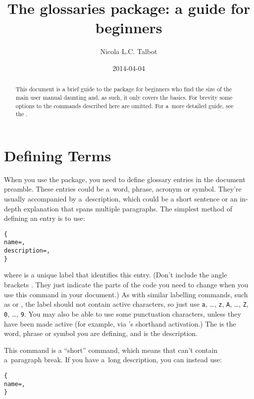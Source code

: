 \documentclass{nlctdoc}
\title{The glossaries package: a guide for beginners}
\author{Nicola L.C. Talbot}
\date{2014-04-04}
\begin{document}
\maketitle

\begin{abstract}
This document is a brief guide to the  package
for beginners who find the size of the main user manual daunting
and, as such, it only covers the basics. For brevity some options to
the commands described here are omitted. For a~more detailed guide,
see the .
\end{abstract}

\tableofcontents

\section{Defining Terms}
\label{sec:defterm}

When you use the  package, you need to define
glossary entries in the document preamble. These entries could be
a~word, phrase, acronym or symbol. They're usually accompanied by
a~description, which could be a short sentence or an in-depth
explanation that spans multiple paragraphs. The simplest method of
defining an entry is to use:
\begin{definition}
\begin{alltt}
\verb|{|
  name=,
  description=,
\verb|}|
\end{alltt}
\end{definition}
where  is a unique label that identifies this entry.
(Don't include the angle brackets \meta{ }. They just indicate the parts of
the code you need to change when you use this command in your document.) As
with similar labelling commands, such as  or ,
the label should not contain active characters, so just use
\texttt{a}, \ldots, \texttt{z}, \texttt{A}, \ldots, \texttt{Z},
\texttt{0}, \ldots, \texttt{9}. You may also be able to use some
punctuation characters, unless they have been made active (for
example, via 's shorthand activation.)
The  is the word, phrase or symbol you are defining,
and  is the description.

This command is a ``short'' command, which means that
 can't contain a~paragraph break. If you have
a~long description, you can instead use:
\begin{definition}
\begin{alltt}
\verb|{|
  name=,
\verb|}|
\end{alltt}
\end{definition}
\end{document}

